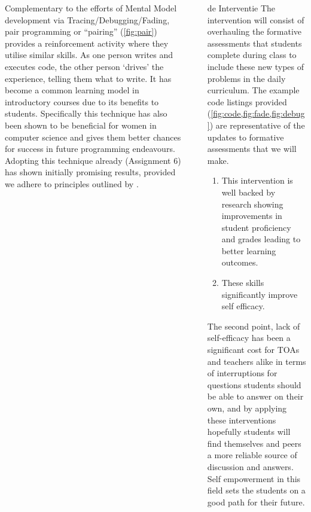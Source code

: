 \documentclass[final]{beamer}
\newlength{\sepwidth}
\newlength{\colwidth}
\newcommand{\separatorcolumn}{\begin{column}{\sepwidth}\end{column}}
\begin{document}
\begin{frame}[t,fragile]
\begin{columns}[t]
\begin{column}{\colwidth}
        Complementary to the efforts of Mental Model development via Tracing/Debugging/Fading, pair programming or ``pairing'' (\cref{fig:pair}) provides a reinforcement activity where they utilise similar skills. As one person writes and executes code, the other person `drives' the experience, telling them what to write\cite{Williams,Williams_2001}. It has become a common learning model in introductory courses due to its benefits to students\cite{mendes2005investigating,mendes2006replicated,Hannay_2007}. Specifically this technique has also been shown to be beneficial for women in computer science and gives them better chances for success in future programming endeavours\cite{werner2004pair}. Adopting this technique already (Assignment 6) has shown initially promising results, provided we adhere to principles outlined by \cite{Mentz_2008}.

\end{column}

\separatorcolumn

\begin{column}{\colwidth}

  \begin{exampleblock}{de Interventie}
      The intervention will consist of overhauling the formative assessments that students complete during class to include these new types of problems in the daily curriculum. The example code listings provided (\cref{fig:code,fig:fade,fig:debug}) are representative of the updates to formative assessments that we will make.

      \begin{enumerate}

          \item This intervention is well backed by research showing improvements in student proficiency and grades\cite{Hertz_2013,Renkl_2002} leading to better learning outcomes\cite{Renkl_2004}.
          \item These skills significantly improve self efficacy\cite{Ramalingam_2004,Michaeli_2019}.
      \end{enumerate}

      The second point, lack of self-efficacy has been a significant cost for TOAs and teachers alike in terms of interruptions for questions students should be able to answer on their own, and by applying these interventions hopefully students will find themselves and peers a more reliable source of discussion and answers. Self empowerment in this field sets the students on a good path for their future.


\end{exampleblock}
\end{column}
\end{columns}
\end{frame}
\end{document}
